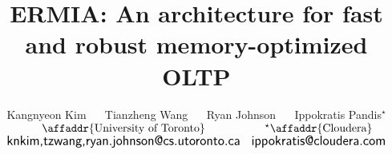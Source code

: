 \documentclass{../common/vldb}
\def\thepapertitle{ERMIA: An architecture for fast and robust memory-optimized OLTP}
\begin{document}
\title{\thepapertitle}

\author{
\alignauthor
Kangnyeon Kim
~~
Tianzheng Wang
~~
Ryan Johnson
~~
Ippokratis Pandis$^\star$
\bigskip\\
$
\begin{array}{cc}
  \mbox{\affaddr{University of Toronto}} &
  \mbox{$^\star$\affaddr{Cloudera}}\\
  \mbox{{\large \sf {knkim,tzwang,ryan.johnson}@cs.utoronto.ca}} &
  \mbox{{\large \sf ippokratis@cloudera.com}}
\end{array}
$
\\
}

\maketitle











{\small %

}

\end{document}
